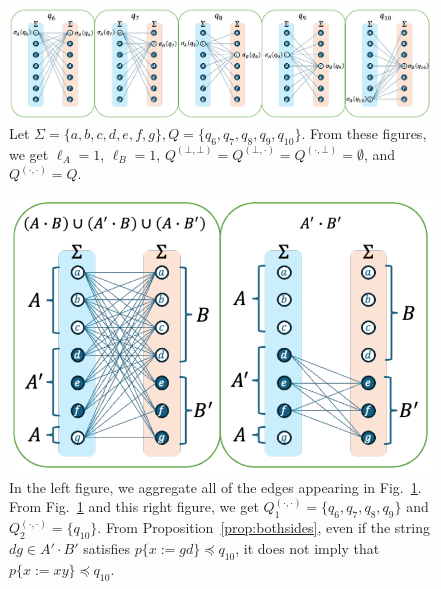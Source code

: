 \begin{figure}[t]
  \begin{center}
    \includegraphics[scale=0.54]{figs/lem8eachreg-suppl.pdf}
    \caption{Let $\Sigma=\{a,b,c,d,e,f,g\}, Q=\{q_6,q_7,q_8,q_9,q_{10}\}$. From these figures, we get $\ell_A=1$, $\ell_B=1$, $Q^{(\bot,\bot)}=Q^{(\bot,\cdot)}=Q^{(\cdot,\bot)}=\emptyset$, and $Q^{(\cdot,\cdot)}=Q$.}\label{fig:lem8eachreg-suppl}
  \end{center}
\end{figure}

\begin{figure}[t]
  \begin{center}
    \includegraphics[scale=0.525]{figs/lem8totalreg-suppl.pdf}
    \caption{In the left figure, we aggregate all of the edges appearing in Fig.~\ref{fig:lem8eachreg-suppl}. From Fig.~\ref{fig:lem8eachreg-suppl} and this right figure, we get $Q_{1}^{(\cdot,\cdot)}=\{q_6,q_7,q_8,q_9\}$ and $Q_{2}^{(\cdot,\cdot)}=\{q_{10}\}$. From Proposition~\ref{prop:bothsides}, even if the string $dg \in A'\cdot B'$ satisfies $p \{ x:=gd \} \preceq q_{10}$, it does not imply that $p \{ x:=xy \} \preceq q_{10}$.}\label{fig:lem8totalreg-suppl}
  \end{center}
\end{figure}

